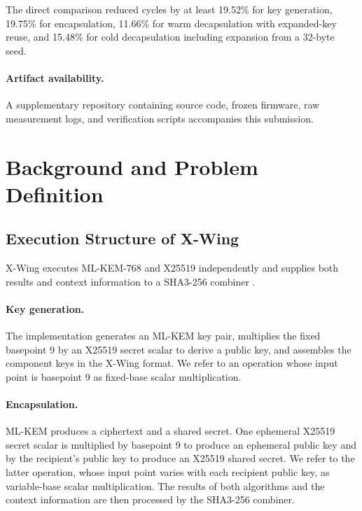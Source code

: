 \documentclass[runningheads,orivec]{llncs}
\newcommand{\xwing}{X-Wing}
\begin{document}
The direct comparison reduced cycles by at least 19.52\% for key generation,
19.75\% for encapsulation, 11.66\% for warm decapsulation with expanded-key
reuse, and 15.48\% for cold decapsulation including expansion from a 32-byte
seed.

\paragraph{Artifact availability.}
A supplementary repository containing source code, frozen firmware, raw
measurement logs, and verification scripts accompanies this submission.

\section{Background and Problem Definition}\label{sec:background}

\subsection{Execution Structure of \xwing{}}

\xwing{} executes ML-KEM-768 and X25519 independently and supplies both results
and context information to a SHA3-256 combiner
\cite{XWingDraft10,FIPS203,RFC7748}.

\paragraph{Key generation.}
The implementation generates an ML-KEM key pair, multiplies the fixed basepoint
9 by an X25519 secret scalar to derive a public key, and assembles the component
keys in the \xwing{} format. We refer to an operation whose input point is
basepoint 9 as fixed-base scalar multiplication.

\paragraph{Encapsulation.}
ML-KEM produces a ciphertext and a shared secret. One ephemeral X25519 secret
scalar is multiplied by basepoint 9 to produce an ephemeral public key and by
the recipient's public key to produce an X25519 shared secret. We refer to the
latter operation, whose input point varies with each recipient public key, as
variable-base scalar multiplication. The results of both algorithms and the
context information are then processed by the SHA3-256 combiner.
\end{document}
